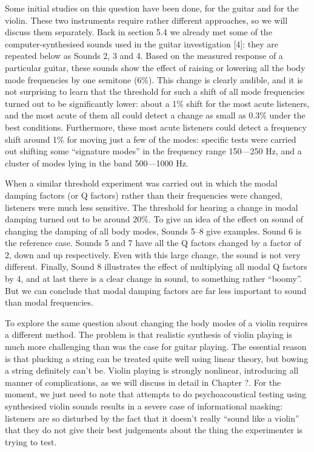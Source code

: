   Some initial studies on this question have been done, for the guitar and for 
  the violin. These two instruments require rather different approaches, so we 
  will discuss them separately. Back in section 5.4 we already met some of the 
  computer-synthesised sounds used in the guitar investigation [4]: they are 
  repeated below as Sounds 2, 3 and 4. Based on the measured response of a 
  particular guitar, these sounds show the effect of raising or lowering all 
  the body mode frequencies by one semitone (6\%). This change is clearly 
  audible, and it is not surprising to learn that the threshold for such a 
  shift of all mode frequencies turned out to be significantly lower: about a 
  1\% shift for the most acute listeners, and the most acute of them all could 
  detect a change as small as 0.3\% under the best conditions. Furthermore, 
  these most acute listeners could detect a frequency shift around 1\% for 
  moving just a few of the modes: specific tests were carried out shifting some 
  “signature modes” in the frequency range 150—250 Hz, and a cluster of modes 
  lying in the band 500—1000 Hz. 

  When a similar threshold experiment was carried out in which the modal 
  damping factors (or Q factors) rather than their frequencies were changed, 
  listeners were much less sensitive. The threshold for hearing a change in 
  modal damping turned out to be around 20\%. To give an idea of the effect on 
  sound of changing the damping of all body modes, Sounds 5--8 give examples. 
  Sound 6 is the reference case. Sounds 5 and 7 have all the Q factors changed 
  by a factor of 2, down and up respectively. Even with this large change, the 
  sound is not very different. Finally, Sound 8 illustrates the effect of 
  multiplying all modal Q factors by 4, and at last there is a clear change in 
  sound, to something rather ``boomy''. But we can conclude that modal damping 
  factors are far less important to sound than modal frequencies. 

  To explore the same question about changing the body modes of a violin 
  requires a different method. The problem is that realistic synthesis of 
  violin playing is much more challenging than was the case for guitar playing. 
  The essential reason is that plucking a string can be treated quite well 
  using linear theory, but bowing a string definitely can’t be. Violin playing 
  is strongly nonlinear, introducing all manner of complications, as we will 
  discuss in detail in Chapter ?. For the moment, we just need to note that 
  attempts to do psychoacoustical testing using synthesised violin sounds 
  results in a severe case of informational masking: listeners are so disturbed 
  by the fact that it doesn’t really “sound like a violin” that they do not 
  give their best judgements about the thing the experimenter is trying to 
  test. 

